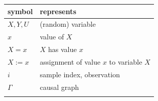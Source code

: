 \documentclass[
]{book}
\theoremstyle{definition}
\theoremstyle{definition}
\theoremstyle{definition}
\theoremstyle{remark}
\begin{document}
\begin{longtable}[]{@{}ll@{}}
\toprule
\begin{minipage}[b]{0.47\columnwidth}\raggedright
symbol\strut
\end{minipage} & \begin{minipage}[b]{0.47\columnwidth}\raggedright
represents\strut
\end{minipage}\tabularnewline
\midrule
\endhead
\begin{minipage}[t]{0.47\columnwidth}\raggedright
\(X, Y, U\)\strut
\end{minipage} & \begin{minipage}[t]{0.47\columnwidth}\raggedright
(random) variable\strut
\end{minipage}\tabularnewline
\begin{minipage}[t]{0.47\columnwidth}\raggedright
\(x\)\strut
\end{minipage} & \begin{minipage}[t]{0.47\columnwidth}\raggedright
value of \(X\)\strut
\end{minipage}\tabularnewline
\begin{minipage}[t]{0.47\columnwidth}\raggedright
\(X =x\)\strut
\end{minipage} & \begin{minipage}[t]{0.47\columnwidth}\raggedright
\(X\) has value \(x\)\strut
\end{minipage}\tabularnewline
\begin{minipage}[t]{0.47\columnwidth}\raggedright
\(X:=x\)\strut
\end{minipage} & \begin{minipage}[t]{0.47\columnwidth}\raggedright
assignment of value \(x\) to variable \(X\)\strut
\end{minipage}\tabularnewline
\begin{minipage}[t]{0.47\columnwidth}\raggedright
\(i\)\strut
\end{minipage} & \begin{minipage}[t]{0.47\columnwidth}\raggedright
sample index, observation\strut
\end{minipage}\tabularnewline
\begin{minipage}[t]{0.47\columnwidth}\raggedright
\(\Gamma\)\strut
\end{minipage} & \begin{minipage}[t]{0.47\columnwidth}\raggedright
causal graph\strut
\end{minipage}\tabularnewline
\begin{minipage}[t]{0.47\columnwidth}\raggedright

\end{minipage}
\end{longtable}
\end{document}
